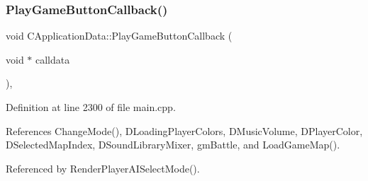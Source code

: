 \subsubsection{\texorpdfstring{Play\+Game\+Button\+Callback()}{PlayGameButtonCallback()}}
{\footnotesize\ttfamily void C\+Application\+Data\+::\+Play\+Game\+Button\+Callback (\begin{DoxyParamCaption}\item[{void $\ast$}]{calldata }\end{DoxyParamCaption})\hspace{0.3cm}{\ttfamily [static]}, {\ttfamily [protected]}}



Definition at line 2300 of file main.\+cpp.



References Change\+Mode(), D\+Loading\+Player\+Colors, D\+Music\+Volume, D\+Player\+Color, D\+Selected\+Map\+Index, D\+Sound\+Library\+Mixer, gm\+Battle, and Load\+Game\+Map().



Referenced by Render\+Player\+A\+I\+Select\+Mode().


